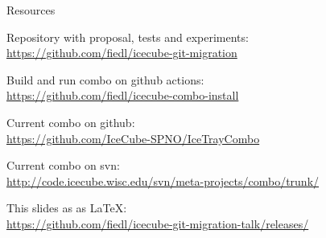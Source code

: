 
\begin{frame}{Resources}
  \begin{center}

    Repository with proposal, tests and experiments: \\
    \url{https://github.com/fiedl/icecube-git-migration}

    \vspace{1em}


    \vspace{1em}

    Build and run combo on github actions: \\
    \url{https://github.com/fiedl/icecube-combo-install}

    \vspace{1em}

    Current combo on github: \\
    \url{https://github.com/IceCube-SPNO/IceTrayCombo}

    \vspace{1em}

    Current combo on svn: \\
    \url{http://code.icecube.wisc.edu/svn/meta-projects/combo/trunk/}

    \vspace{1em}

    This slides as as \LaTeX: \\
    \url{https://github.com/fiedl/icecube-git-migration-talk/releases/}

  \end{center}
\end{frame}